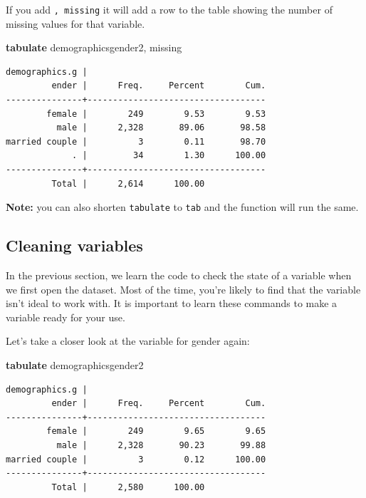 \documentclass[
]{book}
\newenvironment{Shaded}{\begin{snugshade}}{\end{snugshade}}
\newcommand{\FunctionTok}[1]{\textcolor[rgb]{0.00,0.00,0.00}{#1}}
\newcommand{\KeywordTok}[1]{\textcolor[rgb]{0.13,0.29,0.53}{\textbf{#1}}}
\newcommand{\NormalTok}[1]{#1}
\begin{document}
If you add \texttt{,\ missing} it will add a row to the table showing the number of missing values for that variable.

\begin{Shaded}
\begin{Highlighting}[]
\KeywordTok{tabulate}\NormalTok{ demographicsgender2, }\FunctionTok{missing}
\end{Highlighting}
\end{Shaded}

\begin{verbatim}
demographics.g |
         ender |      Freq.     Percent        Cum.
---------------+-----------------------------------
        female |        249        9.53        9.53
          male |      2,328       89.06       98.58
married couple |          3        0.11       98.70
             . |         34        1.30      100.00
---------------+-----------------------------------
         Total |      2,614      100.00
\end{verbatim}

\textbf{Note:} you can also shorten \texttt{tabulate} to \texttt{tab} and the function will run the same.

\hypertarget{cleaning-variables}{%
\subsection*{Cleaning variables}\label{cleaning-variables}}

In the previous section, we learn the code to check the state of a variable when we first open the dataset. Most of the time, you're likely to find that the variable isn't ideal to work with. It is important to learn these commands to make a variable ready for your use.

Let's take a closer look at the variable for gender again:

\begin{Shaded}
\begin{Highlighting}[]
\KeywordTok{tabulate}\NormalTok{ demographicsgender2}
\end{Highlighting}
\end{Shaded}

\begin{verbatim}
demographics.g |
         ender |      Freq.     Percent        Cum.
---------------+-----------------------------------
        female |        249        9.65        9.65
          male |      2,328       90.23       99.88
married couple |          3        0.12      100.00
---------------+-----------------------------------
         Total |      2,580      100.00
\end{verbatim}
\end{document}
